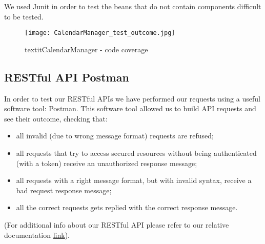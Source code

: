 We used Junit in order to test the beans that do not contain components difficult to be tested.
\begin{figure}[H]
	\begin{center}
		\texttt{[image: CalendarManager\_test\_outcome.jpg]}
	\end{center}
\caption{ textit{CalendarManager} - code coverage}
\end{figure}

\subsection{RESTful API Postman}
In order to test our RESTful APIs we have performed our requests using a useful software tool: Postman. This software tool allowed us to build API requests and see their outcome, checking that:
\begin{itemize}
	\item all invalid (due to wrong message format) requests are refused;
	\item all requests that try to access secured resources without being authenticated (with a token) receive an unauthorized response message;
	\item all requests with a right message format, but with invalid syntax, receive a bad request response message;
	\item all the correct requests gets replied with the correct response message. 
\end{itemize}
(For additional info about our RESTful API please refer to our relative documentation \href{httpsdocumenter.getpostman.comview2934379travlendar-restful-api7Log3CL}{\color{blue}link}).


